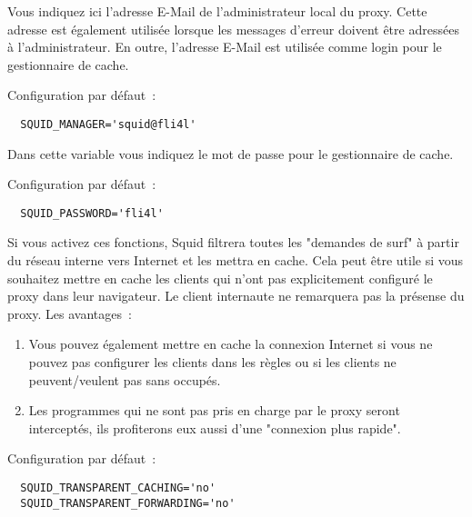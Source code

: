 \begin{description}

                Vous indiquez ici l'adresse \mbox{E-Mail} de l'administrateur
                local du proxy. Cette adresse est également utilisée lorsque
                les messages d'erreur doivent être adressées à l'administrateur.
                En outre, l'adresse \mbox{E-Mail} est utilisée comme login
                pour le gestionnaire de cache.

                Configuration par défaut~:
\begin{verbatim}
  SQUID_MANAGER='squid@fli4l'
\end{verbatim}



                Dans cette variable vous indiquez le mot de passe pour
                le gestionnaire de cache.

                Configuration par défaut~:
\begin{verbatim}
  SQUID_PASSWORD='fli4l'
\end{verbatim}



                Si vous activez ces fonctions, Squid filtrera toutes les "demandes
				de surf" à partir du réseau interne vers Internet et les mettra en
				cache. Cela peut être utile si vous souhaitez mettre en cache les
				clients qui n'ont pas explicitement configuré le proxy dans leur
				navigateur. Le client internaute ne remarquera pas la présense du
				proxy. Les avantages~:
\begin{enumerate}
	\item{ Vous pouvez également mettre en cache la connexion
           Internet si vous ne pouvez pas configurer les
           clients dans les règles ou si les clients ne
           peuvent/veulent pas sans occupés.}

	\item{ Les programmes qui ne sont pas pris en charge par
           le proxy seront interceptés, ils profiterons
           eux aussi d'une "connexion plus rapide".}
\end{enumerate}

                Configuration par défaut~:
\begin{verbatim}
  SQUID_TRANSPARENT_CACHING='no'
  SQUID_TRANSPARENT_FORWARDING='no'
\end{verbatim}


\end{description}
